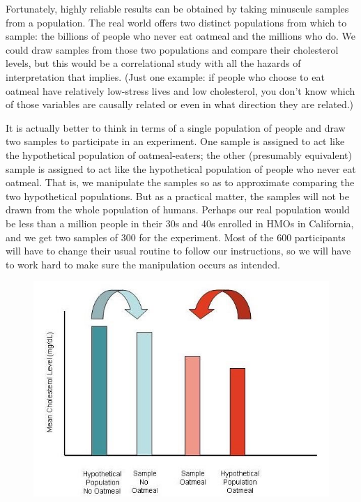 \begin{refsection}
Fortunately, highly reliable results can be obtained by taking minuscule samples from a population. The real world offers two distinct populations from which to sample: the billions of people who never eat oatmeal and the millions who do. We could draw samples from those two populations and compare their cholesterol levels, but this would be a correlational study with all the hazards of interpretation that implies. (Just one example: if people who choose to eat oatmeal have relatively low-stress lives and low cholesterol, you don't know which of those variables are causally related or even in what direction they are related.)

It is actually better to think in terms of a single population of people and draw two samples to participate in an experiment. One sample is assigned to act like the hypothetical population of oatmeal-eaters; the other (presumably equivalent) sample is assigned to act like the hypothetical population of people who never eat oatmeal. That is, we manipulate the samples so as to approximate comparing the two hypothetical populations. But as a practical matter, the samples will not be drawn from the whole population of humans. Perhaps our real population would be less than a million people in their 30s and 40s enrolled in HMOs in California, and we get two samples of 300 for the experiment. Most of the 600 participants will have to change their usual routine to follow our instructions, so we will have to work hard to make sure the manipulation occurs as intended.

\begin{figure}[htbp]
\centering
\includegraphics[keepaspectratio,width=\textwidth,height=0.75\textheight]{experimentSamplesHypotheticalPopulations.jpg}
\label{experimentsampleshypotheticalpopulations.jpg}
\end{figure}


\end{refsection}
